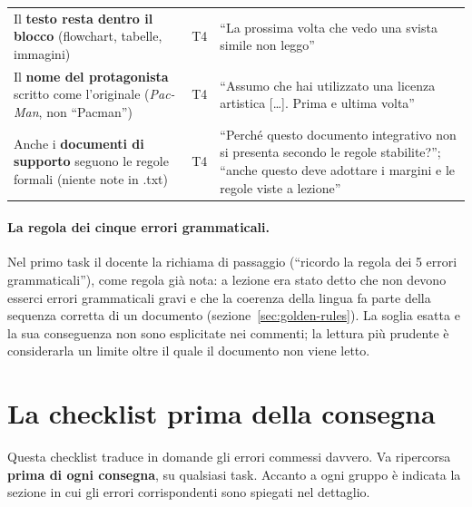 \begin{table}[htbp]
\begin{tabular}{@{}p{5.1cm}p{1.1cm}p{5.6cm}@{}}
    \addlinespace
    Il \textbf{testo resta dentro il blocco} (flowchart, tabelle, immagini) &
      T4 & ``La prossima volta che vedo una svista simile non leggo'' \\
    \addlinespace
    Il \textbf{nome del protagonista} scritto come l'originale
    (\emph{Pac-Man}, non ``Pacman'') &
      T4 & ``Assumo che hai utilizzato una licenza artistica [\dots]. Prima e
      ultima volta'' \\
    \addlinespace
    Anche i \textbf{documenti di supporto} seguono le regole formali (niente
    note in .txt) &
      T4 & ``Perché questo documento integrativo non si presenta secondo le
      regole stabilite?''; ``anche questo deve adottare i margini e le regole
      viste a lezione'' \\
    \bottomrule
  \end{tabular}
\end{table}

\paragraph{La regola dei cinque errori grammaticali.} Nel primo task il
docente la richiama di passaggio (``ricordo la regola dei 5 errori
grammaticali''), come regola già nota: a lezione era stato detto che non
devono esserci errori grammaticali gravi e che la coerenza della lingua fa
parte della sequenza corretta di un documento
(sezione~\ref{sec:golden-rules}). La soglia esatta e la sua conseguenza non
sono esplicitate nei commenti; la lettura più prudente è considerarla un
limite oltre il quale il documento non viene letto.

\section{La checklist prima della consegna}
\label{rv:sec:checklist}

Questa checklist traduce in domande gli errori commessi davvero. Va
ripercorsa \textbf{prima di ogni consegna}, su qualsiasi task. Accanto a ogni
gruppo è indicata la sezione in cui gli errori corrispondenti sono spiegati
nel dettaglio.

